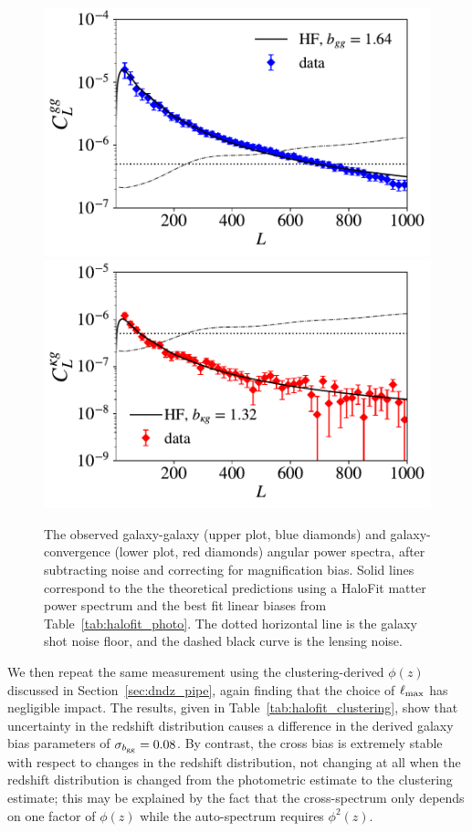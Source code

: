 \documentclass[a4paper,usenatbib]{mnras}
\begin{document}
\begin{figure}
\includegraphics[width=\linewidth]{figures/cl_gg_hf.pdf}
\includegraphics[width=\linewidth]{figures/cl_kg_hf.pdf}
\caption{The observed galaxy-galaxy (upper plot, blue diamonds) and galaxy-convergence (lower plot, red diamonds) angular power spectra, after subtracting noise and correcting for magnification bias. Solid lines correspond to the the theoretical predictions using a HaloFit matter power spectrum and the best fit linear biases from Table~\ref{tab:halofit_photo}. The dotted horizontal line is the galaxy shot noise floor, and the dashed black curve is the lensing noise.}
\label{fig:cl_halofit}
\end{figure}

We then repeat the same measurement using the clustering-derived $\phi(z)$ discussed in Section~\ref{sec:dndz_pipe}, again finding that the choice of $\ell_{\rm max}$ has negligible impact. The results, given in Table~\ref{tab:halofit_clustering}, show that uncertainty in the redshift distribution causes a difference in the derived galaxy bias parameters of $\sigma_{b_{\rm gg}} = 0.08$. By contrast, the cross bias is extremely stable with respect to changes in the redshift distribution, not changing at all when the redshift distribution is changed from the photometric estimate to the clustering estimate; this may be explained by the fact that the cross-spectrum only depends on one factor of $\phi(z)$ while the auto-spectrum requires $\phi^2(z)$.
\end{document}
